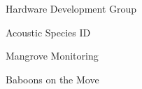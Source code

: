 \item Hardware Development Group
\item Acoustic Species ID
\item Mangrove Monitoring
\item Baboons on the Move
